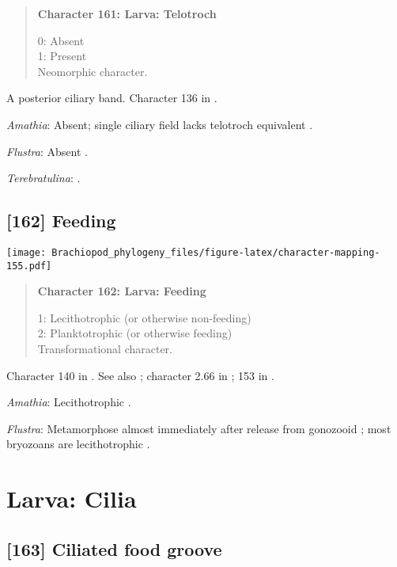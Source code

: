 \documentclass[openany]{book}
\theoremstyle{definition}
\theoremstyle{definition}
\theoremstyle{definition}
\theoremstyle{remark}
\begin{document}
\begin{quote}
\textbf{Character 161: Larva: Telotroch}

0: Absent\\
1: Present\\
Neomorphic character.
\end{quote}

A posterior ciliary band. Character 136 in \citet{Rouse1999}.

\hypertarget{Amathia-coding-161}{}
\emph{Amathia}: Absent; single ciliary field lacks telotroch equivalent
\citep{Reed1982}.

\hypertarget{Flustra-coding-161}{}
\emph{Flustra}: Absent \citep{Zimmer2013}.

\hypertarget{Terebratulina-coding-161}{}
\emph{Terebratulina}: \citet{Williams1997Introduction}.

\subsection*{{[}162{]} Feeding}\label{feeding}

\texttt{[image: Brachiopod\_phylogeny\_files/figure-latex/character-mapping-155.pdf]}

\begin{quote}
\textbf{Character 162: Larva: Feeding}

1: Lecithotrophic (or otherwise non-feeding)\\
2: Planktotrophic (or otherwise feeding)\\
Transformational character.
\end{quote}

Character 140 in \citet{Rouse1999}. See also \citet{Collin1997};
character 2.66 in \citet{SPS1996}; 153 in \citet{Giribet2002}.

\hypertarget{Amathia-coding-162}{}
\emph{Amathia}: Lecithotrophic \citep{Reed1982}.

\hypertarget{Flustra-coding-162}{}
\emph{Flustra}: Metamorphose almost immediately after release from
gonozooid \citep{Zimmer2013}; most bryozoans are lecithotrophic
\citep{Reed1982}.

\section{Larva: Cilia}\label{larva-cilia}

\subsection*{{[}163{]} Ciliated food groove}\label{ciliated-food-groove}
\end{document}
